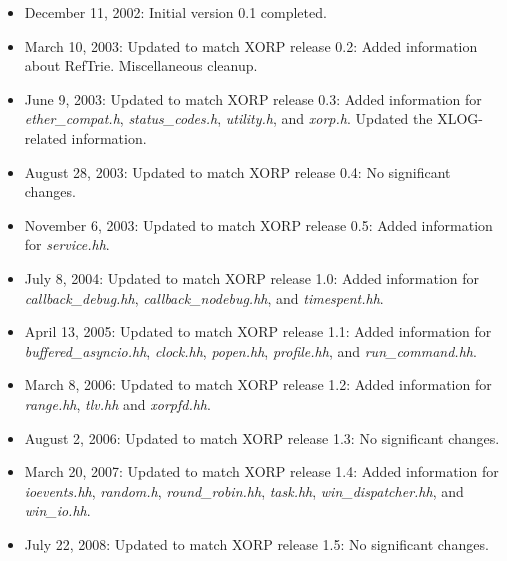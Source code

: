 \documentclass[11pt]{article}
\begin{document}
\begin{itemize}

  \item December 11, 2002: Initial version 0.1 completed.

  \item March 10, 2003: Updated to match XORP release 0.2:
   Added information about RefTrie. Miscellaneous cleanup.

  \item June 9, 2003: Updated to match XORP release 0.3:
   Added information for \emph{ether\_compat.h}, \emph{status\_codes.h},
   \emph{utility.h}, and \emph{xorp.h}. Updated the XLOG-related
   information.

  \item August 28, 2003: Updated to match XORP release 0.4:
   No significant changes.

  \item November 6, 2003: Updated to match XORP release 0.5:
   Added information for \emph{service.hh}.

  \item July 8, 2004: Updated to match XORP release 1.0:
   Added information for \emph{callback\_debug.hh},
   \emph{callback\_nodebug.hh}, and \emph{timespent.hh}.

  \item April 13, 2005: Updated to match XORP release 1.1:
   Added information for \emph{buffered\_asyncio.hh}, \emph{clock.hh},
   \emph{popen.hh}, \emph{profile.hh}, and \emph{run\_command.hh}.

  \item March 8, 2006: Updated to match XORP release 1.2:
   Added information for \emph{range.hh}, \emph{tlv.hh} and
   \emph{xorpfd.hh}.

  \item August 2, 2006: Updated to match XORP release 1.3:
   No significant changes.

  \item March 20, 2007: Updated to match XORP release 1.4:
   Added information for \emph{ioevents.hh}, \emph{random.h},
   \emph{round\_robin.hh}, \emph{task.hh}, \emph{win\_dispatcher.hh},
   and \emph{win\_io.hh}.

  \item July 22, 2008: Updated to match XORP release 1.5:
   No significant changes.

\end{itemize}




\end{document}
